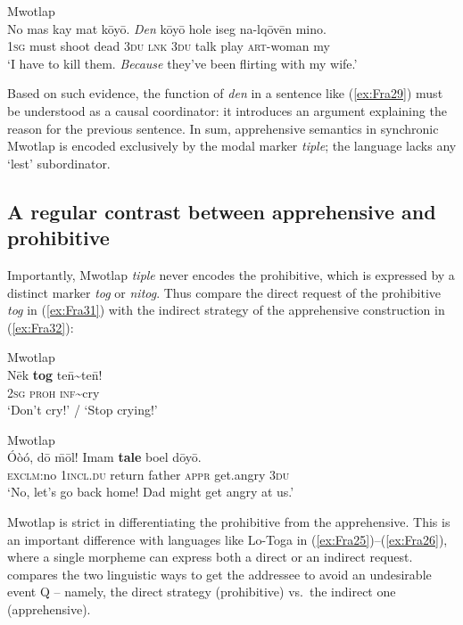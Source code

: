\documentclass[output=paper,colorlinks,citecolor=brown]{langscibook}
\begin{document}
\ea \label{ex:Fra30} \textnormal{Mwotlap}  \\
\gll No mas kay mat kōyō. \textit{Den} kōyō hole iseg na-lqōvēn mino. \\
\textsc{1sg} must shoot dead \textsc{3du} \textsc{lnk} \textsc{3du} talk play \textsc{art}-woman my \\
\glt `I have to kill them. \textit{Because} they've been flirting with my wife.' 
\z

 Based on such evidence, the function of \textit{den} in a sentence like (\ref{ex:Fra29}) must be understood as a causal coordinator: it introduces an argument explaining the reason for the previous sentence. In sum, apprehensive semantics in synchronic Mwotlap is encoded exclusively by the modal marker \textit{tiple}; the language lacks any `lest' subordinator.





\subsection{A regular contrast between apprehensive and prohibitive}
\label{subsec:contrast}

Importantly, Mwotlap \textit{tiple} never encodes the prohibitive, which is expressed by a distinct marker \textit{tog} or \textit{nitog}. Thus compare the direct request of the prohibitive \textit{tog} in (\ref{ex:Fra31}) with the indirect strategy of the apprehensive construction in (\ref{ex:Fra32}):
 

\ea \label{ex:Fra31} \textnormal{Mwotlap}  \\
\gll Nēk \textbf{tog} te\={n}\textasciitilde te\={n}! \\
\textsc{2sg} \textsc{proh} \textsc{inf}\textasciitilde cry \\
\glt `Don't cry!' / `Stop crying!' 
\z

\ea \label{ex:Fra32} \textnormal{Mwotlap}  \\
\gll Óòó, dō \={m}ōl! Imam \textbf{tale} boel dōyō. \\
\textsc{exclm}:no \textsc{1incl.du} return father \textsc{appr} get.angry \textsc{3du} \\
\glt `No, let's go back home! Dad might get angry at us.' 
\z

Mwotlap is strict in differentiating the prohibitive from the apprehensive. This is an important difference with languages like Lo-Toga in (\ref{ex:Fra25})--(\ref{ex:Fra26}), where a single morpheme can express both a direct or an indirect request.  compares the two linguistic ways to get the addressee to avoid an undesirable event Q -- namely, the direct strategy (prohibitive) vs.\ the indirect one (apprehensive).
\end{document}
